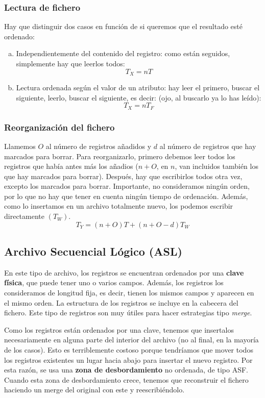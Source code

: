 \subsubsection{Lectura de fichero}
Hay que distinguir dos casos en función de si queremos que el resultado esté ordenado:
\begin{enumerate}[(a)]
\item Independientemente del contenido del registro: como están seguidos, simplemente hay que leerlos todos:
\[
T_X=nT
\]
\item Lectura ordenada según el valor de un atributo: hay leer el primero, buscar el siguiente, leerlo, buscar el siguiente, es decir: (ojo, al buscarlo ya lo has leído):
\[
T_X=nT_F
\]
\end{enumerate}
\subsubsection{Reorganización del fichero}
Llamemos $O$ al número de registros añadidos y $d$ al número de registros que hay marcados para borrar. Para reorganizarlo, primero debemos leer todos los registros que había antes más los añadios ($n+O$, en $n$, van incluidos también los que hay marcados para borrar). Después, hay que escribirlos todos otra vez, excepto los marcados para borrar. Importante, no consideramos ningún orden, por lo que no hay que tener en cuenta ningún tiempo de ordenación. Además, como lo insertamos en un archivo totalmente nuevo, los podemos escribir directamente $(T_W)$.
\[
T_Y=(n+O)T+(n+O-d)T_W
\]
\subsection{Archivo Secuencial Lógico (ASL)}

En este tipo de archivo, los registros se encuentran ordenados por una \textbf{clave física}, que puede tener uno o varios campos. Además, los registros los consideramos de longitud fija, es decir, tienen los mismos campos y aparecen en el mismo orden. La estructura de los registros se incluye en la cabecera del fichero. Este tipo de registros son muy útiles para hacer estrategias tipo \textit{merge}.

Como los registros están ordenados por una clave, tenemos que insertalos necesariamente en alguna parte del interior del archivo (no al final, en la mayoría de los casos). Esto es terriblemente costoso porque tendríamos que mover todos los registros existentes un lugar hacia abajo para insertar el nuevo registro. Por esta razón, se usa una \textbf{zona de desbordamiento} no ordenada, de tipo ASF. Cuando esta zona de desbordamiento crece, tenemos que reconstruir el fichero haciendo un merge del original con este y reescribiéndolo.

